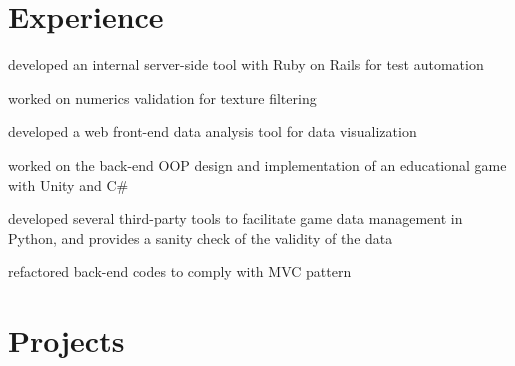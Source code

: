 \documentclass[]{deedy-resume-openfont}
\begin{document}
\begin{minipage}[t]{0.66\textwidth} 


\section{Experience}

\vspace{\topsep} %
\begin{tightemize} 
\item developed an internal server-side tool with Ruby on Rails for test automation
\item worked on numerics validation for texture filtering
\item developed a web front-end data analysis tool for data visualization
\end{tightemize}
\sectionsep

\begin{tightemize} 
\item worked on the back-end OOP design and implementation of an educational game with Unity and C\#
\item developed several third-party tools to facilitate game data management in Python, and provides a sanity check of the validity of the data
\item refactored back-end codes to comply with MVC pattern
\end{tightemize}
\sectionsep



\section{Projects}


\end{minipage}
\end{document}
